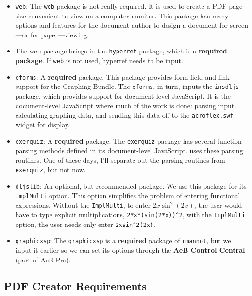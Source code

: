 \documentclass{article}
\begin{document}
\begin{itemize}
\begin{itemize}
    \item \texttt{web}: The \texttt{web} package is not really
    required. It is used to create a PDF page size convenient to
    view on a computer monitor. This package has many options and
    features for the document author to design a document for
    screen---or for paper---viewing.

    \item[]The web package brings in the \texttt{hyperref} package,
    which is a \textbf{required package}. If \texttt{web} is not
    used, hyperref needs to be input.

    \item \texttt{eforms}: A \textbf{required} package. This package
    provides form field and link support for the {\AcroFLeX}
    Graphing Bundle. The \texttt{eforms}, in turn, inputs the
    \texttt{insdljs} package, which provides support for document-level
    JavaScript. It is the document-level JavaScript where much of the work
    is done: parsing input, calculating graphing data, and sending
    this data off to the \texttt{acroflex.swf} widget for display.

    \item \texttt{exerquiz}: A \textbf{required} package. The
    \texttt{exerquiz} package has several function parsing methods defined
    in its document-level JavaScript. {\AcroFLeX} uses these parsing
    routines.  One of these days, I'll separate out the parsing
    routines from \texttt{exerquiz}, but not now.

    \item \texttt{dljslib}: An optional, but recommended package.
    We use this package for its \texttt{ImplMulti} option.
    This option simplifies the problem of entering
    functional expressions. Without the \texttt{ImplMulti},
    to enter $2x\sin^2(2x)$, the user would have to type
    explicit multiplications, \verb!2*x*(sin(2*x))^2!, with
    the \texttt{ImplMulti} option, the user needs only enter
    \verb!2xsin^2(2x)!.

    \item \texttt{graphicxsp}: The  \texttt{graphicxsp} is a
    \textbf{required} package of \texttt{rmannot}, but we input it
    earlier so we can set its options through the \textbf{AeB
    Control Central} (part of AeB Pro).

  \end{itemize}
\end{itemize}

\subsection{PDF Creator Requirements}
\end{document}
